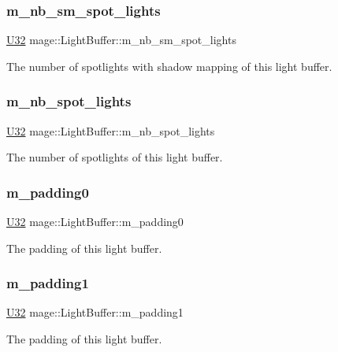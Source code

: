 \subsubsection{\texorpdfstring{m\+\_\+nb\+\_\+sm\+\_\+spot\+\_\+lights}{m\_nb\_sm\_spot\_lights}}
{\footnotesize\ttfamily \hyperlink{namespacemage_a41c104c036fba3756a74e19f793eeaa1}{U32} mage\+::\+Light\+Buffer\+::m\+\_\+nb\+\_\+sm\+\_\+spot\+\_\+lights}

The number of spotlights with shadow mapping of this light buffer. \hypertarget{structmage_1_1_light_buffer_a33b37a8de8ebd92ad4911d68e836f79f}{}\label{structmage_1_1_light_buffer_a33b37a8de8ebd92ad4911d68e836f79f} 
\subsubsection{\texorpdfstring{m\+\_\+nb\+\_\+spot\+\_\+lights}{m\_nb\_spot\_lights}}
{\footnotesize\ttfamily \hyperlink{namespacemage_a41c104c036fba3756a74e19f793eeaa1}{U32} mage\+::\+Light\+Buffer\+::m\+\_\+nb\+\_\+spot\+\_\+lights}

The number of spotlights of this light buffer. \hypertarget{structmage_1_1_light_buffer_a047221bb9ffc7e782c8865be1d39d568}{}\label{structmage_1_1_light_buffer_a047221bb9ffc7e782c8865be1d39d568} 
\subsubsection{\texorpdfstring{m\+\_\+padding0}{m\_padding0}}
{\footnotesize\ttfamily \hyperlink{namespacemage_a41c104c036fba3756a74e19f793eeaa1}{U32} mage\+::\+Light\+Buffer\+::m\+\_\+padding0}

The padding of this light buffer. \hypertarget{structmage_1_1_light_buffer_ac300e3454170680db1e290537fbf4a11}{}\label{structmage_1_1_light_buffer_ac300e3454170680db1e290537fbf4a11} 
\subsubsection{\texorpdfstring{m\+\_\+padding1}{m\_padding1}}
{\footnotesize\ttfamily \hyperlink{namespacemage_a41c104c036fba3756a74e19f793eeaa1}{U32} mage\+::\+Light\+Buffer\+::m\+\_\+padding1}

The padding of this light buffer. 